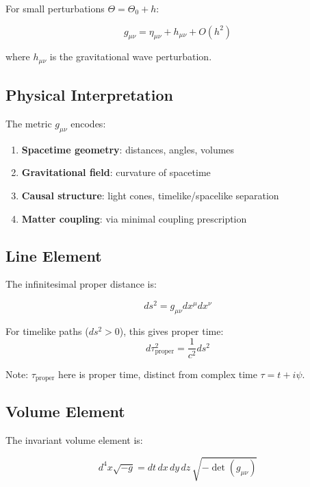 For small perturbations $\Theta = \Theta_0 + h$:

\begin{equation}
\label{eq:canonical:weak_field}
g_{\mu\nu} = \eta_{\mu\nu} + h_{\mu\nu} + O(h^2)
\end{equation}

where $h_{\mu\nu}$ is the gravitational wave perturbation.

\subsection{Physical Interpretation}

The metric $g_{\mu\nu}$ encodes:

\begin{enumerate}
    \item \textbf{Spacetime geometry}: distances, angles, volumes
    \item \textbf{Gravitational field}: curvature of spacetime
    \item \textbf{Causal structure}: light cones, timelike/spacelike separation
    \item \textbf{Matter coupling}: via minimal coupling prescription
\end{enumerate}

\subsection{Line Element}

The infinitesimal proper distance is:

\begin{equation}
\label{eq:canonical:line_element}
ds^2 = g_{\mu\nu} dx^\mu dx^\nu
\end{equation}

For timelike paths ($ds^2 > 0$), this gives proper time:
\begin{equation}
d\tau_{\text{proper}}^2 = \frac{1}{c^2} ds^2
\end{equation}

Note: $\tau_{\text{proper}}$ here is proper time, distinct from complex time $\tau = t + i\psi$.

\subsection{Volume Element}

The invariant volume element is:

\begin{equation}
\label{eq:canonical:volume_element}
d^4x \sqrt{-g} = dt\, dx\, dy\, dz\, \sqrt{-\det(g_{\mu\nu})}
\end{equation}

